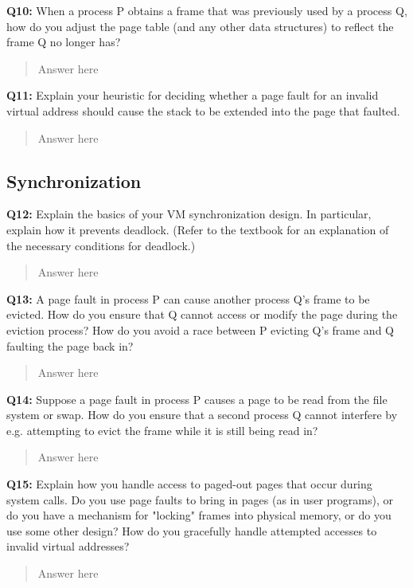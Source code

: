 \documentclass[a4paper,11pt]{paper}
\begin{document}
\textbf{Q10:} When a process P obtains a frame that was previously used by a process Q, how do you adjust the page table (and any other data structures) to reflect the frame Q no longer has?
\begin{quote}
  Answer here
\end{quote}

\textbf{Q11:} Explain your heuristic for deciding whether a page fault for an invalid virtual address should cause the stack to be extended into the page that faulted.
\begin{quote}
  Answer here
\end{quote}

\subsection{Synchronization}

\textbf{Q12:} Explain the basics of your VM synchronization design.  In particular, explain how it prevents deadlock.  (Refer to the textbook for an explanation of the necessary conditions for deadlock.)
\begin{quote}
  Answer here
\end{quote}

\textbf{Q13:} A page fault in process P can cause another process Q's frame to be evicted. How do you ensure that Q cannot access or modify the page during the eviction process?  How do you avoid a race between P evicting Q's frame and Q faulting the page back in?
\begin{quote}
  Answer here
\end{quote}

\textbf{Q14:} Suppose a page fault in process P causes a page to be read from the file system or swap.  How do you ensure that a second process Q cannot interfere by e.g. attempting to evict the frame while it is still being read in?
\begin{quote}
  Answer here
\end{quote}

\textbf{Q15:} Explain how you handle access to paged-out pages that occur during system calls.  Do you use page faults to bring in pages (as in user programs), or do you have a mechanism for "locking" frames into physical memory, or do you use some other design?  How do you gracefully handle attempted accesses to invalid virtual addresses?
\begin{quote}
  Answer here
\end{quote}
\end{document}
